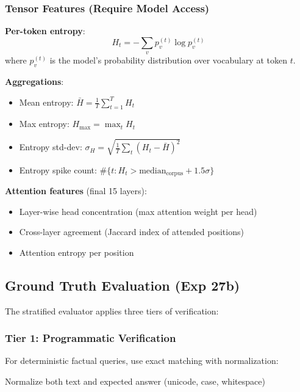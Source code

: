 \documentclass[12pt]{article}
\begin{document}
\subsubsection{Tensor Features (Require Model Access)}

\textbf{Per-token entropy}:
\begin{equation}
H_t = -\sum_v p_v^{(t)} \log p_v^{(t)}
\end{equation}
where $p_v^{(t)}$ is the model's probability distribution over vocabulary at token $t$.

\textbf{Aggregations}:
\begin{itemize}
    \item Mean entropy: $\bar{H} = \frac{1}{T} \sum_{t=1}^T H_t$
    \item Max entropy: $H_{\max} = \max_t H_t$
    \item Entropy std-dev: $\sigma_H = \sqrt{\frac{1}{T}\sum_t(H_t - \bar{H})^2}$
    \item Entropy spike count: $\#\{t : H_t > \text{median}_{\text{corpus}} + 1.5\sigma\}$
\end{itemize}

\textbf{Attention features} (final 15 layers):
\begin{itemize}
    \item Layer-wise head concentration (max attention weight per head)
    \item Cross-layer agreement (Jaccard index of attended positions)
    \item Attention entropy per position
\end{itemize}

\subsection{Ground Truth Evaluation (Exp 27b)}

The stratified evaluator applies three tiers of verification:

\subsubsection{Tier 1: Programmatic Verification}

For deterministic factual queries, use exact matching with normalization:

\begin{algorithm}[H]
\SetAlgoLined
{}

Normalize both text and expected answer (unicode, case, whitespace)\;
\;
\caption{Tier 1 Programmatic Matching}
\end{algorithm}
\end{document}
